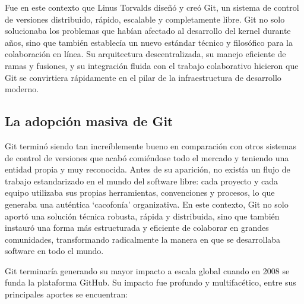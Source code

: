 \documentclass[a4paper,12pt]{article}
\begin{document}
Fue en este contexto que Linus Torvalds diseñó y creó Git, un sistema de control
de versiones distribuido, rápido, escalable y completamente libre. Git no solo
solucionaba los problemas que habían afectado al desarrollo del kernel durante
años, sino que también establecía un nuevo estándar técnico y filosófico para la
colaboración en línea. Su arquitectura descentralizada, su manejo eficiente de
ramas y fusiones, y su integración fluida con el trabajo colaborativo hicieron
que Git se convirtiera rápidamente en el pilar de la infraestructura de
desarrollo moderno.


\subsection{La adopción masiva de Git}

Git terminó siendo tan increíblemente bueno en comparación con otros sistemas de
control de versiones que acabó comiéndose todo el mercado y teniendo una entidad
propia y muy reconocida. Antes de su aparición, no existía un flujo de trabajo
estandarizado en el mundo del software libre: cada proyecto y cada equipo
utilizaba sus propias herramientas, convenciones y procesos, lo que generaba una
auténtica `cacofonía' organizativa. En este contexto, Git no solo aportó una
solución técnica robusta, rápida y distribuida, sino que también instauró una
forma más estructurada y eficiente de colaborar en grandes comunidades,
transformando radicalmente la manera en que se desarrollaba software en todo el
mundo.

Git terminaría generando su mayor impacto a escala global cuando en 2008 se
funda la plataforma GitHub. Su impacto fue profundo y multifacético, entre sus
principales aportes se encuentran:
\end{document}
